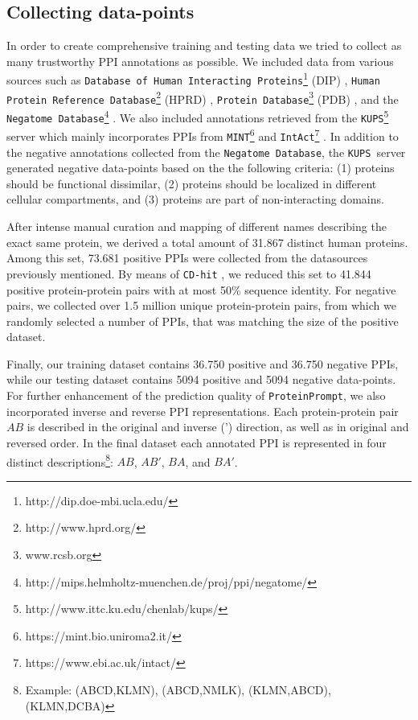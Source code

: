 \documentclass[preprint,3p,times,twocolumn]{elsarticle}
\newcommand{\nega}{\texttt{Negatome Database}}
\newcommand{\kups}{\texttt{KUPS}}
\newcommand{\tool}{\texttt{ProteinPrompt}\hspace{2pt}}
\begin{document}
\subsection{Collecting data-points}
In order to create comprehensive training and testing data we tried to
collect as many trustworthy PPI annotations as possible. We included
data from various sources such as \texttt{Database of Human
  Interacting Proteins}\footnote{http://dip.doe-mbi.ucla.edu/} (DIP)
\cite{Salwinski:2004}, \texttt{Human Protein Reference
  Database}\footnote{http://www.hprd.org/} (HPRD)
\cite{Keshava_Prasad:2009}, \texttt{Protein
  Database}\footnote{www.rcsb.org} (PDB) \cite{Berman:2000}, and the
\nega\footnote{http://mips.helmholtz-muenchen.de/proj/ppi/negatome/}
\cite{Blohm:2014}. We also included annotations retrieved from the
\kups \footnote{http://www.ittc.ku.edu/chenlab/kups/}   server
\cite{Chen:2011} which mainly incorporates PPIs from
\texttt{MINT}\footnote{https://mint.bio.uniroma2.it/}
\cite{Licata:2012} and
\texttt{IntAct}\footnote{https://www.ebi.ac.uk/intact/}
\cite{Orchard:2014}. In addition to the negative annotations collected
from the \nega, the \kups\ server generated negative data-points based
on the the following criteria: (1) proteins should be functional
dissimilar, (2) proteins should be localized in different cellular
compartments, and (3) proteins are part of non-interacting domains. 

After intense manual curation and mapping of different names describing
the exact same protein, we derived a total amount of 31.867 distinct
human proteins. Among this set, 73.681 positive PPIs were collected
from the datasources previously mentioned. By means of \texttt{CD-hit}
\cite{Li:2006, Fu:2012}, we reduced this set to 41.844 positive
protein-protein pairs with at most 50\% sequence identity. For
negative pairs, we collected over 1.5 million unique protein-protein
pairs, from which we randomly selected a number of PPIs, that was
matching the size of the positive dataset.

Finally, our training dataset contains 36.750 positive and 36.750
negative PPIs, while our testing dataset contains 5094 positive and
5094 negative data-points. For further enhancement of the prediction
quality of \tool, we also incorporated inverse and reverse PPI
representations. Each protein-protein pair $AB$ is described in the
original and inverse (') direction, as well as in original and
reversed order. In the final dataset each annotated PPI is represented
in four distinct descriptions\footnote{Example: (ABCD,KLMN),
  (ABCD,NMLK), (KLMN,ABCD), (KLMN,DCBA)}: $AB$, $AB'$, $BA$, and
$BA'$. 
\end{document}
